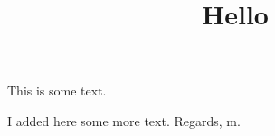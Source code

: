 \documentclass{article}
\title{Hello}
\begin{document}
\maketitle
	
This is some text.

I added here some more text.
Regards, m.
\end{document}
